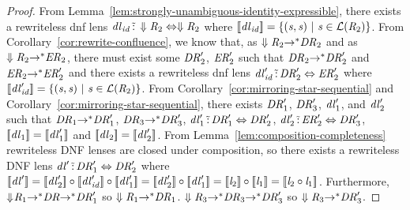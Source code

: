 \documentclass[numbers,10pt,preprint\ifanon ,nocopyrightspace\fi]{sigplanconf}
\begin{document}
\begin{proof}
  From Lemma~\ref{lem:strongly-unambiguous-identity-expressible}, there exists
  a rewriteless dnf lens
  $\mathit{dl}_{\mathit{id}} \,\tilde{:}\, \Downarrow{\ensuremath{\mathit{R}}_2} \Leftrightarrow
  \Downarrow{\ensuremath{\mathit{R}}_2}$ where $[ \! [\mathit{dl}_{\mathit{id}}] \! ] =
  \{(\mathit{s},\mathit{s})~|~ \mathit{s}\in\mathcal{L}(\mathit{R}_2)\}$.
  From Corollary~\ref{cor:rewrite-confluence}, we know that, as
  $\Downarrow{\ensuremath{\mathit{R}}_2}{\ensuremath{\rightarrow}}^*\mathit{DR}_2$ and as
  $\Downarrow{\ensuremath{\mathit{R}}_2}{\ensuremath{\rightarrow}}^*\mathit{ER}_2$, there must exist some
  $\mathit{DR}_2'$, $\mathit{ER}_2'$ such that
  $\mathit{DR}_2{\rightarrow}^*\mathit{DR}_2'$ and
  $\mathit{ER}_2{\rightarrow}^*\mathit{ER}_2'$ and there exists a rewriteless dnf
  lens $\mathit{dl}_{\mathit{id}}' \,\tilde{:}\, \mathit{DR}_2' \Leftrightarrow
  \mathit{ER}_2'$ where $[ \! [\mathit{dl}_{\mathit{id}}'] \! ] =
  \{(\mathit{s},\mathit{s})~|~ \mathit{s}\in\mathcal{L}(\mathit{R}_2)\}$.
  From Corollary~\ref{cor:mirroring-star-sequential} and
  Corollary~\ref{cor:mirroring-star-sequential}, there exists
  $\mathit{DR}_1'$, $\mathit{DR}_3'$, $\mathit{dl}_1'$, and $\mathit{dl}_2'$ such that
  $\mathit{DR}_1{\rightarrow}^*\mathit{DR}_1'$, $\mathit{DR}_3{\rightarrow}^*\mathit{DR}_3'$,
  $\mathit{dl}_1' \,\tilde{:}\, \mathit{DR}_1' \Leftrightarrow \mathit{DR}_2'$,
  $\mathit{dl}_2' \,\tilde{:}\, \mathit{ER}_2' \Leftrightarrow \mathit{DR}_3'$,
  $[ \! [\mathit{dl}_1] \! ] = [ \! [\mathit{dl}_1'] \! ]$ and
  $[ \! [\mathit{dl}_2] \! ] = [ \! [\mathit{dl}_2'] \! ]$.  From
  Lemma~\ref{lem:composition-completeness}
  rewriteless DNF lenses are closed under composition, so there exists a
  rewriteless DNF lens $\mathit{dl}' \,\tilde{:}\, \mathit{DR}_1' \Leftrightarrow
  \mathit{DR}_2'$ where $\SemanticsOf{\DNFLens'} = \SemanticsOf{\DNFLens_2'}
  \Compose \SemanticsOf{\DNFLens_{\IdentityLens}'} \Compose
  \SemanticsOf{\DNFLens_1'} = \SemanticsOf{\DNFLens_2'} \Compose
  \SemanticsOf{\DNFLens_1'} = \SemanticsOf{\Lens_2} \Compose
  \SemanticsOf{\Lens_1} = \SemanticsOf{\Lens_2\Compose\Lens_1}$.  Furthermore,
  $\Downarrow\mkern-4mu \mathit{R}_1 {\rightarrow}^* \mathit{DR} {\rightarrow}^* \mathit{DR}_1'$ so
  $\Downarrow{\ensuremath{\mathit{R}}_1} {\ensuremath{\rightarrow}}^* \mathit{DR}_1$. $\Downarrow{\ensuremath{\mathit{R}}_3}
  {\ensuremath{\rightarrow}}^* \mathit{DR}_3 {\rightarrow}^* \mathit{DR}_3'$ so $\Downarrow{\ensuremath{\mathit{R}}_3}
  {\ensuremath{\rightarrow}}^* \mathit{DR}_3'$.


\end{proof}
\end{document}
